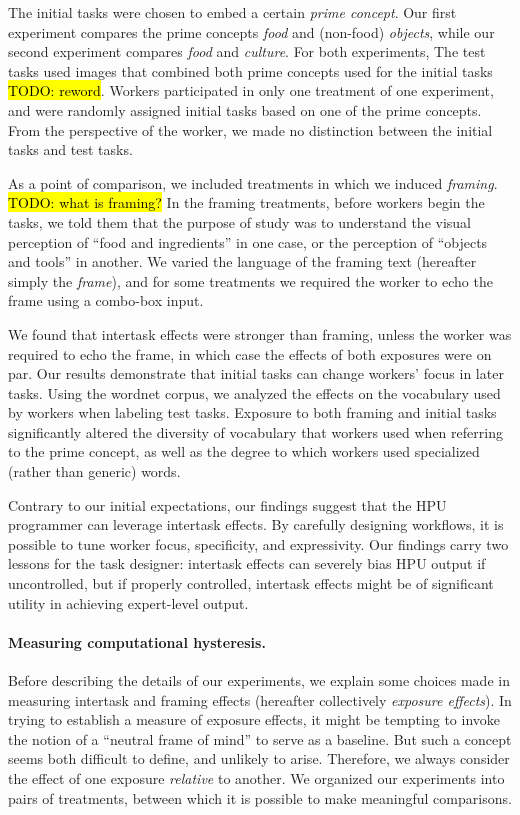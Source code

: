 \documentclass[12pt]{article}
\newcommand{\td}[1]{{\color{blu}\hl{TODO: #1}}}
\begin{document}
The initial tasks were chosen to embed a certain \textit{prime concept}.
Our first experiment compares the prime concepts \textit{food} and (non-food) 
\textit{objects}, while our second experiment compares \textit{food} and 
\textit{culture}.  For both experiments, The test tasks used images that
combined both prime concepts used for the initial tasks \td{reword}.  Workers participated 
in only one treatment of one experiment, and were randomly assigned initial 
tasks based on one of the prime concepts.  From the perspective of the worker, 
we made no distinction between the initial tasks and test tasks.

As a point of comparison, we included treatments in which we induced
\textit{framing}. \td{what is framing?}
In the framing treatments, before workers begin the tasks, we told them that 
the purpose of study was to understand the visual perception of 
``food and ingredients'' in one case, or the 
perception of ``objects and tools'' in another.  We varied the language of 
the framing text (hereafter simply the \textit{frame}), and for some treatments
we required the worker to echo the frame using a combo-box input.

We found that intertask effects were stronger than framing, unless the worker
was required to echo the frame, in which case the effects of both exposures were on par.  
Our results demonstrate that initial tasks can change 
workers' focus in later tasks.  Using the wordnet corpus, we analyzed 
the effects on the vocabulary used by workers when 
labeling test tasks. 
Exposure to both framing and initial tasks significantly altered the 
diversity of vocabulary that workers used when referring to the prime concept,
as well as the degree to which workers used specialized (rather than generic) 
words.

Contrary to our initial expectations, our findings suggest that the HPU 
programmer can leverage intertask effects.  By carefully designing workflows,
it is possible to tune worker focus, specificity, and expressivity.  Our 
findings carry two lessons for the task designer: intertask
effects can severely bias HPU output if uncontrolled, but if properly 
controlled, intertask effects might be of significant utility in achieving 
expert-level output.

\paragraph*{Measuring computational hysteresis.}
Before describing the details of our experiments, we explain some 
choices made in measuring intertask and framing effects 
(hereafter collectively \textit{exposure effects}).  
In trying to establish a measure of exposure effects, it might be tempting to 
invoke the notion of a ``neutral frame of mind'' to serve as a baseline. 
But such a concept seems both difficult to define, and unlikely to arise.
Therefore, we always consider the effect of one exposure 
\textit{relative} to another.  We organized our experiments 
into pairs of treatments, between which it is possible to make meaningful 
comparisons.  
\end{document}

